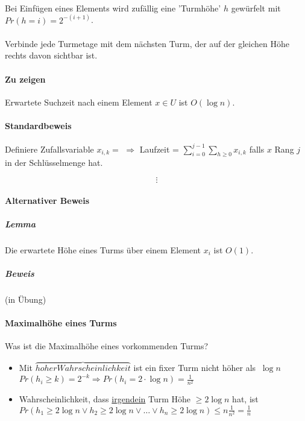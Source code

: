 \paragraph*{} Bei Einfügen eines Elements wird zufällig eine 'Turmhöhe' $h$ gewürfelt mit $Pr(h=i)=2^{-(i+1)}$.

\paragraph*{} Verbinde jede Turmetage mit dem nächsten Turm, der auf der gleichen Höhe rechts davon sichtbar ist.


\paragraph*{Zu zeigen} Erwartete Suchzeit nach einem Element $x \in U$ ist $O(\log n)$.

\paragraph*{Standardbeweis} Definiere Zufallsvariable $x_{i,k} = $ %
$\Rightarrow$ Laufzeit = $\sum\limits_{i=0}^{j-1} \sum\limits_{h \geq 0} x_{i,k}$ falls $x$ Rang $j$ in der Schlüsselmenge hat.

$$\vdots$$

\paragraph*{Alternativer Beweis}
\subparagraph*{Lemma} Die erwartete Höhe eines Turms über einem Element $x_i$ ist $O(1)$.
\subparagraph*{Beweis} (in Übung)

\paragraph*{Maximalhöhe eines Turms} Was ist die Maximalhöhe eines vorkommenden Turms?
\begin{itemize}
	\item Mit $\overbrace{hoher Wahrscheinlichkeit}$%
	ist ein fixer Turm nicht höher als $~ \log n$ %
	$Pr(h_i \geq k) = 2^{-k} \Rightarrow Pr(h_i = 2 \cdot \log n) = \frac{1}{n^2}$
	\item Wahrscheinlichkeit, dass \underline{irgendein} Turm Höhe $\geq 2 \log n$ hat, ist $Pr(h_1 \geq 2 \log n \lor h_2 \geq 2 \log n \lor \dots \lor h_n \geq 2 \log n) \leq n \frac{1}{n^2} = \frac{1}{n}$ %
\end{itemize}

